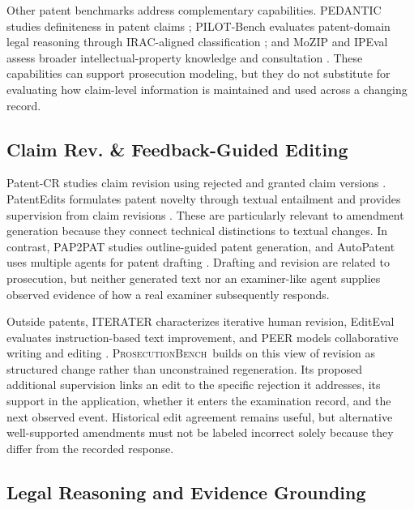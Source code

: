 \documentclass[11pt]{article}
\newcommand{\bench}{\textsc{ProsecutionBench}}
\begin{document}
Other patent benchmarks address complementary capabilities. PEDANTIC studies definiteness in patent claims \citep{knappich2025pedantic}; PILOT-Bench evaluates patent-domain legal reasoning through IRAC-aligned classification \citep{jang2025pilot}; and MoZIP and IPEval assess broader intellectual-property knowledge and consultation \citep{ni2024mozip,wang2024ipeval}. These capabilities can support prosecution modeling, but they do not substitute for evaluating how claim-level information is maintained and used across a changing record.

\subsection{Claim Rev. \& Feedback-Guided Editing}
\label{sec:rw-claim-revision}

Patent-CR studies claim revision using rejected and granted claim versions \citep{jiang2024patentcr}. PatentEdits formulates patent novelty through textual entailment and provides supervision from claim revisions \citep{lee2024patentedits}. These are particularly relevant to amendment generation because they connect technical distinctions to textual changes. In contrast, PAP2PAT studies outline-guided patent generation, and AutoPatent uses multiple agents for patent drafting \citep{knappich2025pap2pat,wang2024autopatent}. Drafting and revision are related to prosecution, but neither generated text nor an examiner-like agent supplies observed evidence of how a real examiner subsequently responds.

Outside patents, ITERATER characterizes iterative human revision, EditEval evaluates instruction-based text improvement, and PEER models collaborative writing and editing \citep{du2022iterater,dwivediyu2024editeval,schick2022peer}. \bench\ builds on this view of revision as structured change rather than unconstrained regeneration. Its proposed additional supervision links an edit to the specific rejection it addresses, its support in the application, whether it enters the examination record, and the next observed event. Historical edit agreement remains useful, but alternative well-supported amendments must not be labeled incorrect solely because they differ from the recorded response.

\subsection{Legal Reasoning and Evidence Grounding}
\label{sec:rw-legal-reasoning}
\end{document}

